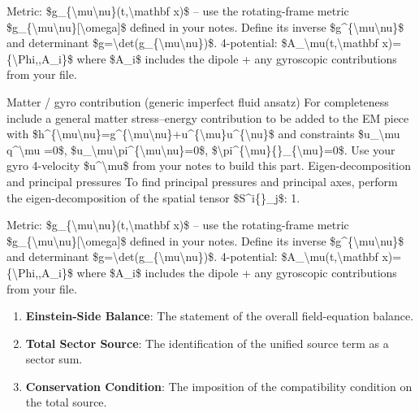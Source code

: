 Metric: \$g\_\{\textbackslash{}mu\textbackslash{}nu\}(t,\textbackslash{}mathbf x)\$ -- use the rotating-frame metric \$g\_\{\textbackslash{}mu\textbackslash{}nu\}[\textbackslash{}omega]\$ defined in your notes. Define its inverse \$g\textasciicircum{}\{\textbackslash{}mu\textbackslash{}nu\}\$ and determinant \$g=\textbackslash{}det(g\_\{\textbackslash{}mu\textbackslash{}nu\})\$. 4-potential: \$A\_\textbackslash{}mu(t,\textbackslash{}mathbf x)=\{\textbackslash{}Phi,,A\_i\}\$ where \$A\_i\$ includes the dipole + any gyroscopic contributions from your file.

Matter / gyro contribution (generic imperfect fluid ansatz) For completeness include a general matter stress--energy contribution to be added to the EM piece with \$h\textasciicircum{}\{\textbackslash{}mu\textbackslash{}nu\}=g\textasciicircum{}\{\textbackslash{}mu\textbackslash{}nu\}+u\textasciicircum{}\{\textbackslash{}mu\}u\textasciicircum{}\{\textbackslash{}nu\}\$ and constraints \$u\_\textbackslash{}mu q\textasciicircum{}\textbackslash{}mu =0\$, \$u\_\textbackslash{}mu\textbackslash{}pi\textasciicircum{}\{\textbackslash{}mu\textbackslash{}nu\}=0\$, \$\textbackslash{}pi\textasciicircum{}\{\textbackslash{}mu\}\{\}\_\{\textbackslash{}mu\}=0\$. Use your gyro 4-velocity \$u\textasciicircum{}\textbackslash{}mu\$ from your notes to build this part. Eigen-decomposition and principal pressures To find principal pressures and principal axes, perform the eigen-decomposition of the spatial tensor \$S\textasciicircum{}i\{\}\_j\$: 1.

Metric: \$g\_\{\textbackslash{}mu\textbackslash{}nu\}(t,\textbackslash{}mathbf x)\$ -- use the rotating-frame metric \$g\_\{\textbackslash{}mu\textbackslash{}nu\}[\textbackslash{}omega]\$ defined in your notes. Define its inverse \$g\textasciicircum{}\{\textbackslash{}mu\textbackslash{}nu\}\$ and determinant \$g=\textbackslash{}det(g\_\{\textbackslash{}mu\textbackslash{}nu\})\$. 4-potential: \$A\_\textbackslash{}mu(t,\textbackslash{}mathbf x)=\{\textbackslash{}Phi,,A\_i\}\$ where \$A\_i\$ includes the dipole + any gyroscopic contributions from your file.
\endgroup

\begin{enumerate}[leftmargin=1.6em,itemsep=6pt,topsep=4pt]
\item \textbf{Einstein-Side Balance}: The statement of the overall field-equation balance.
\item \textbf{Total Sector Source}: The identification of the unified source term as a sector sum.
\item \textbf{Conservation Condition}: The imposition of the compatibility condition on the total source.
\end{enumerate}


